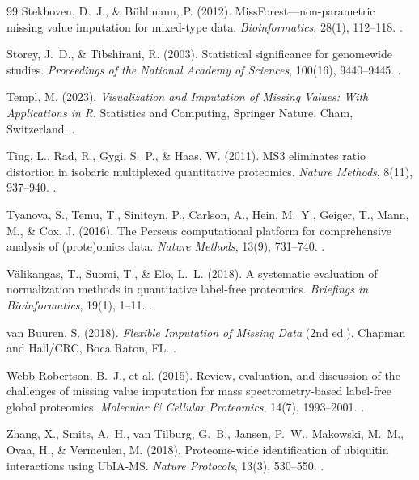 \documentclass[11pt,oneside]{book}
\begin{document}
\begin{thebibliography}{99}
Stekhoven, D.~J., \& B\"uhlmann, P. (2012). MissForest---non-parametric missing value imputation for mixed-type data. \textit{Bioinformatics}, 28(1), 112--118. .

Storey, J.~D., \& Tibshirani, R. (2003). Statistical significance for genomewide studies. \textit{Proceedings of the National Academy of Sciences}, 100(16), 9440--9445. .

Templ, M. (2023). \textit{Visualization and Imputation of Missing Values: With Applications in R}. Statistics and Computing, Springer Nature, Cham, Switzerland. .

Ting, L., Rad, R., Gygi, S.~P., \& Haas, W. (2011). MS3 eliminates ratio distortion in isobaric multiplexed quantitative proteomics. \textit{Nature Methods}, 8(11), 937--940. .

Tyanova, S., Temu, T., Sinitcyn, P., Carlson, A., Hein, M.~Y., Geiger, T., Mann, M., \& Cox, J. (2016). The Perseus computational platform for comprehensive analysis of (prote)omics data. \textit{Nature Methods}, 13(9), 731--740. .

V\"alikangas, T., Suomi, T., \& Elo, L.~L. (2018). A systematic evaluation of normalization methods in quantitative label-free proteomics. \textit{Briefings in Bioinformatics}, 19(1), 1--11. .

van Buuren, S. (2018). \textit{Flexible Imputation of Missing Data} (2nd ed.). Chapman and Hall/CRC, Boca Raton, FL. .

Webb-Robertson, B.~J., et al. (2015). Review, evaluation, and discussion of the challenges of missing value imputation for mass spectrometry-based label-free global proteomics. \textit{Molecular \& Cellular Proteomics}, 14(7), 1993--2001. .

Zhang, X., Smits, A.~H., van Tilburg, G.~B., Jansen, P.~W., Makowski, M.~M., Ovaa, H., \& Vermeulen, M. (2018). Proteome-wide identification of ubiquitin interactions using UbIA-MS. \textit{Nature Protocols}, 13(3), 530--550. .

\end{thebibliography}
\end{document}
